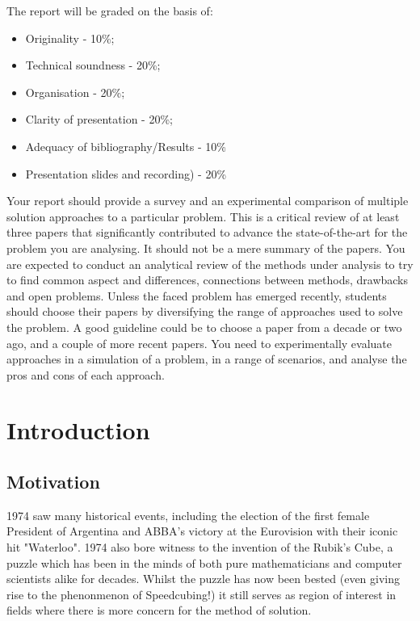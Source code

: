\documentclass[UKenglish]{svproc}
\begin{document}
The report will be graded on the basis of:

\begin{itemize}
\item Originality - 10\%;
\item Technical soundness - 20\%;
\item Organisation - 20\%;
\item Clarity of presentation - 20\%;
\item Adequacy of bibliography/Results - 10\%
\item Presentation slides and recording) - 20\%
\end{itemize}





Your report should provide a survey and an experimental comparison of multiple solution approaches to a particular problem. This is a critical review of at least three papers that significantly contributed to advance the state-of-the-art for the problem you are analysing. It should not be a mere summary of the papers. You are expected to conduct an analytical review of the methods under analysis to try to find common aspect and differences, connections between methods, drawbacks and open problems. Unless the faced problem has emerged recently, students should choose their papers by diversifying the range of approaches used to solve the problem. A good guideline could be to choose a paper from a decade or two ago, and a couple of more recent papers. You need to experimentally evaluate approaches in a simulation of a problem, in a range of scenarios, and analyse the pros and cons of each approach. 
\fi

\section{Introduction}
\subsection{Motivation}
1974 saw many historical events, including the election of the first female President of Argentina and ABBA's victory at the Eurovision with their iconic hit "Waterloo". 1974 also bore witness to the invention of the Rubik's Cube, a puzzle which has been in the minds of both pure mathematicians and computer scientists alike for decades. Whilst the puzzle has now been bested (even giving rise to the phenonmenon of Speedcubing!) it still serves as region of interest in fields where there is more concern for the method of solution.
\end{document}

